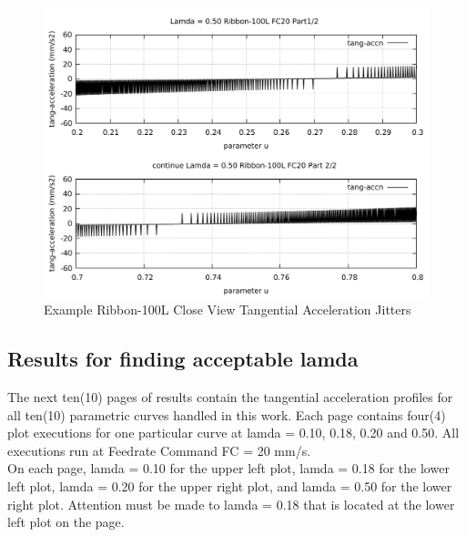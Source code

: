 \clearpage
\pagebreak
\begin{landscape}
	\begin{figure}
		\centering
		\caption  {Example Ribbon-100L Close View Tangential Acceleration Jitters}
		\label{img-Example Ribbon-100L Close View Tangential Acceleration Jitters}
		\includegraphics[width=1.30\textwidth]{Chap4/Lamda/jitters/Example-Ribbon-100L-Jitters-Lamda-050-FC20-Part-2-of-2.pdf} 
	\end{figure}
\end{landscape}

\clearpage
\pagebreak

\subsection{Results for finding acceptable lamda} \label{ssec-Results for finding acceptable lamda}

The next ten(10) pages of results contain the tangential acceleration profiles for all ten(10) parametric curves handled in this work. Each page contains four(4) plot executions for one particular curve at lamda = 0.10, 0.18, 0.20 and 0.50. All executions run at Feedrate Command FC = 20 mm/s. \\

On each page, lamda = 0.10 for the upper left plot, lamda = 0.18 for the lower left plot, lamda = 0.20 for the upper right plot, and lamda = 0.50 for the lower right plot. Attention must be made to lamda = 0.18 that is located at the lower left plot on the page. \\

